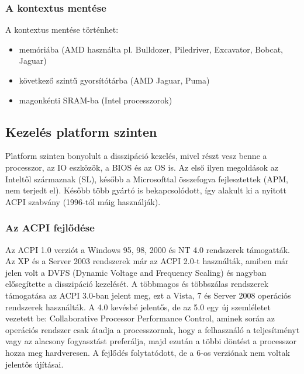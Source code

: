 \subsubsection{A kontextus mentése}
A kontextus mentése történhet:
\begin{itemize}
    \item memóriába (AMD használta pl. Bulldozer, Piledriver, Excavator, Bobcat, Jaguar)
    \item következő szintű gyorsítótárba (AMD Jaguar, Puma)
    \item magonkénti SRAM-ba (Intel processzorok)
\end{itemize}

\subsection{Kezelés platform szinten}
Platform szinten bonyolult a disszipáció kezelés, mivel részt vesz benne a processzor, az IO eszközök, a BIOS és az OS is.
Az első ilyen megoldások az Inteltől származnak (SL), később a Microsofttal összefogva fejlesztettek (APM, nem terjedt el).
Később több gyártó is bekapcsolódott, így alakult ki a nyitott ACPI szabvány (1996-tól máig használják).

\subsubsection{Az ACPI fejlődése}
Az ACPI 1.0 verziót a Windows 95, 98, 2000 és NT 4.0 rendszerek támogatták.
Az XP és a Server 2003 rendszerek már az ACPI 2.0-t használták, amiben már jelen volt a DVFS (Dynamic Voltage and Frequency Scaling) és nagyban elősegítette a disszipáció kezelését.
A többmagos és többszálas rendszerek támogatása az ACPI 3.0-ban jelent meg, ezt a Vista, 7 és Server 2008 operációs rendszerek használták.
A 4.0 kevésbé jelentős, de az 5.0 egy új szemléletet vezetett be: Collaborative Processor Performance Control, aminek során az operációs rendszer csak átadja a processzornak, hogy a felhasználó a teljesítményt vagy az alacsony fogyasztást preferálja, majd ezután a többi döntést a processzor hozza meg hardveresen.
A fejlődés folytatódott, de a 6-os verziónak nem voltak jelentős újításai.